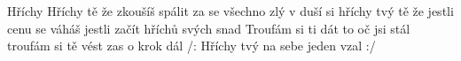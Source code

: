 \begin{TEXT}{Hříchy}
\REFREN  Hříchy  tě  že \NL
zkoušíš spálit  za se \NL
všechno zlý v duší  si   \NL
hříchy tvý tě  že 
\SLOKA {} jestli  cenu se  \NL
váháš jestli  začít  \NL
hříchů svých snad   
\SLOKA Troufám si ti dát to oč jsi stál \NL
troufám si tě vést zas o krok dál \NL
/: Hříchy tvý na sebe jeden vzal :/ \NL
\end{TEXT}
